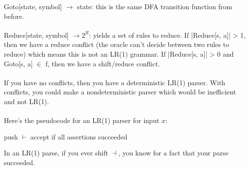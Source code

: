 \documentclass[]{article}
\theoremstyle{definition}
\begin{document}
				Goto[state, symbol] $\to$ state: this is the same DFA transition function from before.
				\\ \\
				Reduce[state, symbol] $\to 2^R$: yields a set of rules to reduce. If |Reduce[s, a]| > 1, then we have a reduce conflict (the oracle can't decide between two rules to reduce) which means this is not an LR(1) grammar. If |Reduce[s, a]| > 0 and Goto[s, a] $\in$ f, then we have a shift/reduce conflict.
				\\ \\
				If you have no conflicts, then you have a deterministic LR(1) parser. With conflicts, you could make a nondeterministic parser which would be inefficient and not LR(1).
				\\ \\
				Here's the pseudocode for an LR(1) parser for input $x$: \\
				\begin{algorithm}[H]
					push $\vdash$\;
					accept if all assertions succeeded\;
				\end{algorithm}
				
				In an LR(1) parse, if you ever shift $\dashv$, you know for a fact that your parse succeeded.
\end{document}
